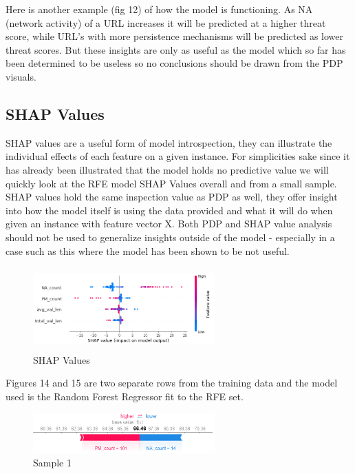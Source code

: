 \documentclass[conference]{IEEEtran}
\begin{document}
Here is another example (fig 12) of how the model is functioning. As NA (network activity) of a URL increases it will be predicted at a higher threat score, while URL's with more persistence mechanisms will be predicted as lower threat scores. But these insights are only as useful as the model which so far has been determined to be useless so no conclusions should be drawn from the PDP visuals.

\subsection{SHAP Values}

SHAP values are a useful form of model introspection, they can illustrate the individual effects of each feature on a given instance. For simplicities sake since it has already been illustrated that the model holds no predictive value we will quickly look at the RFE model SHAP Values overall and from a small sample. SHAP values hold the same inspection value as PDP as well, they offer insight into how the model itself is using the data provided and what it will do when given an instance with feature vector X. Both PDP and SHAP value analysis should not be used to generalize insights outside of the model - especially in a case such as this where the model has been shown to be not useful.

\begin{figure}[h]
\centerline{\includegraphics[width=2.75in, height=1.25in]{shapval.PNG}}
\caption{SHAP Values}
\label{fig}
\end{figure}

Figures 14 and 15 are two separate rows from the training data and the model used is the Random Forest Regressor fit to the RFE set.

\begin{figure}[h]
\centerline{\includegraphics[width=2.75in, height=.75in]{shapsamp1.PNG}}
\caption{Sample 1}
\label{fig}
\end{figure}
\end{document}
